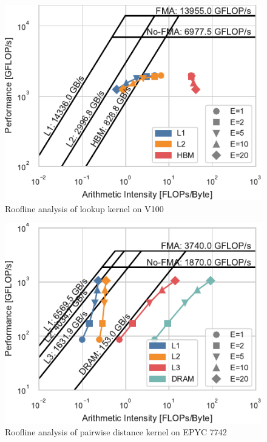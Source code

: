 \documentclass[conference]{IEEEtran}
\begin{document}
\begin{figure}
    \centering
    \includegraphics{figs/roofline_lookup_v100}
    \caption{Roofline analysis of lookup kernel on V100}%
    \label{fig:architecture}
\end{figure}

\begin{figure}
    \centering
    \includegraphics{figs/roofline_distances_epyc}
    \caption{Roofline analysis of pairwise distance kernel on EPYC 7742}%
    \label{fig:architecture}
\end{figure}
\end{document}
